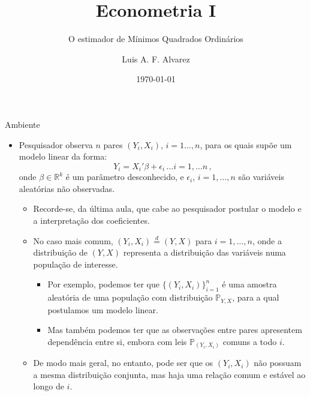 \documentclass[11pt]{beamer}
\author{Luis A. F. Alvarez}
\title{Econometria I}
\subtitle{O estimador de Mínimos Quadrados Ordinários}
\date{\today}
\begin{document}
\begin{frame}[plain]
	\maketitle
\end{frame}
\begin{frame}{Ambiente}
	\begin{itemize}
		\item Pesquisador observa $n$ pares $(Y_i,X_i)$, $i=1\ldots, n$, para os quais supõe um modelo linear da forma:
		\begin{equation}
			\label{eq_line}
			Y_i = X_i'\beta + \epsilon_i\, \ldots  i=1,\ldots n\, ,
		\end{equation}
		onde $\beta\in \mathbb{R}^k$ é um parâmetro desconhecido, e $\epsilon_i$, $i=1,\ldots, n$ são variáveis aleatórias não observadas.
		\begin{itemize}
			\item Recorde-se, da última aula, que cabe ao pesquisador postular o modelo e a interpretação dos coeficientes.
			\item No caso mais comum, $(Y_i,X_i) \overset{d}{=} (Y,X)$ para $i=1,\ldots, n$, onde a distribuição de $(Y,X)$ representa a distribuição das variáveis numa população de interesse.
			\begin{itemize}
				\item Por exemplo, podemos ter que $\{(Y_i, X_i)\}_{i=1}^n$ é uma amostra aleatória de uma população com distribuição $\mathbb{P}_{Y,X}$, para a qual postulamos um modelo linear.
				\item Mas também podemos ter que as observações entre pares apresentem dependência entre si, embora com leis $\mathbb{P}_{(Y_i, X_i)}$ comuns a todo $i$.
			\end{itemize} 
			\item De modo mais geral, no entanto, pode ser que os $(Y_i,X_i)$ não possuam a mesma distribuição conjunta, mas haja uma relação comum e estável ao longo de $i$.
		\end{itemize}
	\end{itemize}
\end{frame}
\end{document}
